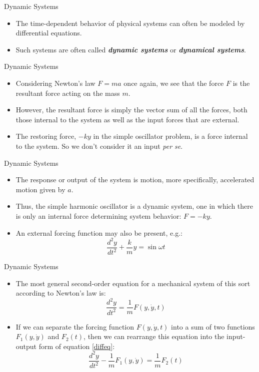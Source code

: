 \begin{frame}
Dynamic Systems
 \begin{itemize}
 \item The time-dependent behavior of physical systems can often
 be modeled by differential equations.
 \item Such systems are often called \textit{\textbf{dynamic systems}} or
 \textit{\textbf{dynamical systems}}.
\end{itemize}
\end{frame}
\begin{frame}
Dynamic Systems
 \begin{itemize}
 \item Considering Newton's law $F=ma$ once again, we see that the
 force $F$ is the resultant force acting on the mass $m$.
 \item However, the resultant force is simply the vector sum of all the forces, both those
 internal to the system as well as the input forces that are external.
 \item The restoring force, $-ky$ in the simple oscillator
 problem, is a force internal to the system.  So we don't consider
 it an input \textit{per se}.
\end{itemize}
\end{frame}
\begin{frame}
Dynamic Systems
 \begin{itemize}
 \item The response or output of the system is motion, more specifically,
 accelerated motion given by $a$.
 \item Thus, the simple harmonic oscillator is a dynamic system, one in which there is only an internal force determining
 system behavior: $F=-ky$.
 \item An external forcing function may also be present, e.g.:
 \[\frac{d^2y}{dt^2}+\frac{k}{m}y=\sin\omega t\]
\end{itemize}
\end{frame}
\begin{frame}
Dynamic Systems
 \begin{itemize}
 \item The most general second-order equation for a mechanical
 system of this sort according to Newton's law is:
\begin{equation}\label{second ord}
  \frac{d^2y}{dt^2} =\frac{1}{m}F(y,\dot{y},t)
\end{equation}
 \item If we can separate the forcing function $F(y,\dot{y},t)$
 into a sum of two functions $F_1(y,\dot{y})$ and $F_2(t)$, then
 we can rearrange this equation into the input-output form of
 equation \eqref{diffeq}:
  \[\frac{d^2y}{dt^2}-\frac{1}{m}F_1(y,\dot{y})=\frac{1}{m}F_2(t)\]
 \end{itemize}
\end{frame}
